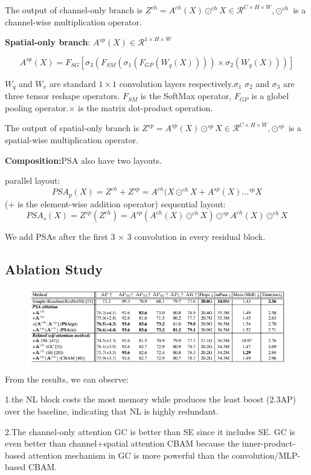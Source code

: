 \documentclass[11pt]{article}
\begin{document}
The output of channel-only branch is $Z^{ch}=A^{ch}(X)\odot^{ch}X\in \mathcal{R}^{C\times H\times W}$,$\odot^{ch}$ is a channel-wise multiplication operator.

\textbf{Spatial-only branch}: $A^{sp}(X) \in \mathcal{R}^{1\times H\times W}$

$$A^{sp}(X)=F_{SG}[\sigma_3(F_{SM}(\sigma_1(F_{GP}(W_q(X))))\times \sigma_2(W_q(X)))]$$

$W_q$ and $W_v$ are standard $1\times 1$ convolution layers respectively.$\sigma_1$ $\sigma_2$ and $\sigma_3$ are three tensor reshape operators. $F_{SM}$ is the SoftMax operator, $F_{GP}$ is a globel pooling operator.$\times$ is the matrix dot-product operation.

The output of spatial-only branch is $Z^{sp}=A^{sp}(X)\odot^{sp}X\in \mathcal{R}^{C\times H\times W}$,$\odot^{sp}$ is a spatial-wise multiplication operator.

\textbf{Composition:}PSA also have two layouts.

\noindent parallel layout: 
$$PSA_p(X) = Z^{ch}+Z^{sp} = A^{ch}(X\odot^{ch}X + A^{sp}(X)\dots^{sp}X$$
(+ is the element-wise addition operator)
\noindent sequential layout:
$$PSA_s(X) = Z^{sp}(Z^{ch}) = A^{sp}(A^{ch}(X)\odot^{ch}X)\odot^{sp}A^{ch}(X)\odot^{ch}X$$

We add PSAs after the first 3 × 3 convolution in every residual block.
\subsection{Ablation Study}
\begin{figure}[h]
	\centering
	\includegraphics[scale = 0.5]{21}
\end{figure}
From the results, we can observe:

1.the NL block costs the most memory while produces the least boost (2.3AP) over the baseline, indicating that NL is highly redundant. 

2.The channel-only attention GC is better than SE since it includes SE. GC is even better than channel+spatial attention CBAM because the inner-product-based attention mechanism in GC is more
powerful than the convolution/MLP-based CBAM.
\end{document}
